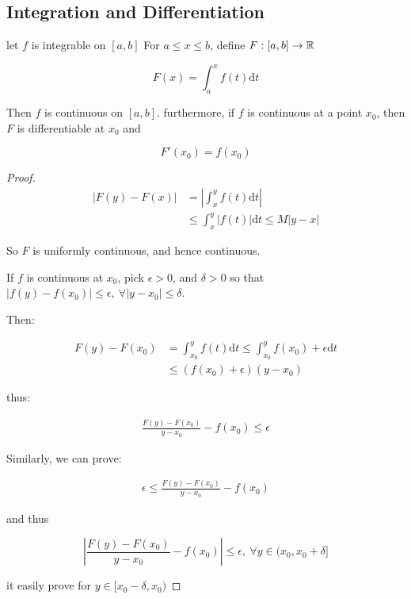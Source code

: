 \subsection{Integration and Differentiation}

\begin{thm}
    let $f$ is integrable on $[a,b]$ For $a \le x \le b$, define $F: [a,b] \to \mathbb{R}$

    \[
        F(x) = \int_a^x f(t) \mathrm{d} t
    \]

    Then $f$ is continuous on $[a,b]$. furthermore, if $f$ is continuous at a point $x_0$,
    then $F$ is differentiable at $x_0$ and
    

    \[
        F'(x_0) = f(x_0)
    \]
\end{thm}

\begin{proof}
    \begin{align*}
        \left| F(y) - F(x) \right| &= \left| \int_x^y f(t) \mathrm{d}t \right| \\
        & \le  \int_x^y \left| f(t) \right| \mathrm{d}t  \le M \left| y-x \right|
    \end{align*}

    So $F$ is uniformly continuous, and hence continuous.

    If $f$ is continuous at $x_0$, pick $\epsilon > 0$, and $\delta > 0$ so that
    $\left| f(y) -f(x_0) \right| \le \epsilon,\: \forall \left| y - x_0 \right| \le \delta$.

    Then:

    \begin{align*}
        F(y) - F(x_0) &= \int_{x_0}^{y} f(t) \mathrm{d}t \le \int_{x_0}^{y} f(x_0) + \epsilon \mathrm{d}t \\
        & \le \left(f(x_0) + \epsilon \right)(y-x_0)
    \end{align*}

    thus:

    \begin{align*}
        \frac{F(y) - F(x_0)}{y-x_0} - f(x_0) \le  \epsilon 
    \end{align*}

    Similarly, we can prove:

    \begin{align*}
        \epsilon \le \frac{F(y) - F(x_0)}{y-x_0} - f(x_0)
    \end{align*}

    and thus

    \[
        \left| \frac{F(y) - F(x_0)}{y-x_0} - f(x_0) \right|\le  \epsilon ,\: \forall y \in (x_0, x_0 + \delta]
    \]

    it easily prove for $y \in [x_0-\delta,x_0)$
    
\end{proof}

